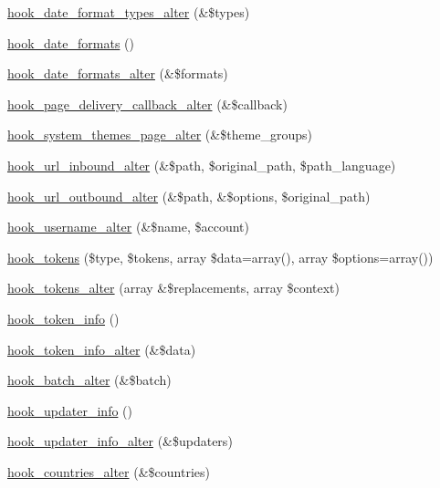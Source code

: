 \begin{DoxyCompactItemize}
\item 
\hyperlink{group__hooks_ga22573783fb241b759f4e3e2c211d13bf}{hook\_\-date\_\-format\_\-types\_\-alter} (\&\$types)
\item 
\hyperlink{group__hooks_ga2a190ba304193ab7752bfc489463a0d7}{hook\_\-date\_\-formats} ()
\item 
\hyperlink{group__hooks_ga0adddc1a49ca34ded3f081894de9d4f7}{hook\_\-date\_\-formats\_\-alter} (\&\$formats)
\item 
\hyperlink{group__hooks_gaee6a1d02d5046d47069a8e385385ef15}{hook\_\-page\_\-delivery\_\-callback\_\-alter} (\&\$callback)
\item 
\hyperlink{group__hooks_ga710e94821a231299d36b2405008121d9}{hook\_\-system\_\-themes\_\-page\_\-alter} (\&\$theme\_\-groups)
\item 
\hyperlink{group__hooks_ga32da9c3f1486c293818f30fa4037e33f}{hook\_\-url\_\-inbound\_\-alter} (\&\$path, \$original\_\-path, \$path\_\-language)
\item 
\hyperlink{group__hooks_gaae456dc4459a029bc099079814ded61f}{hook\_\-url\_\-outbound\_\-alter} (\&\$path, \&\$options, \$original\_\-path)
\item 
\hyperlink{group__hooks_ga877faf93c9acc42bb54cbd01cd8d9453}{hook\_\-username\_\-alter} (\&\$name, \$account)
\item 
\hyperlink{group__hooks_ga3bfd87d9a19b2397b0f970e1cff7ea4f}{hook\_\-tokens} (\$type, \$tokens, array \$data=array(), array \$options=array())
\item 
\hyperlink{group__hooks_gaeeea438e74b29e5603f0ed3f1967a257}{hook\_\-tokens\_\-alter} (array \&\$replacements, array \$context)
\item 
\hyperlink{group__hooks_gab868597197cf36911f95dcd29ae0b954}{hook\_\-token\_\-info} ()
\item 
\hyperlink{group__hooks_ga87392434688c9f52c4066de4ab9d73a8}{hook\_\-token\_\-info\_\-alter} (\&\$data)
\item 
\hyperlink{group__batch_ga135f2f5d27bc51f905cf9f36bde06a2e}{hook\_\-batch\_\-alter} (\&\$batch)
\item 
\hyperlink{group__hooks_gafb9b375716a0ad02d35250dc252b3c99}{hook\_\-updater\_\-info} ()
\item 
\hyperlink{group__hooks_gaf697fc432c34c994712849afa70c1b89}{hook\_\-updater\_\-info\_\-alter} (\&\$updaters)
\item 
\hyperlink{group__hooks_gaceba413e5b878b5f04668d1aa4fcb804}{hook\_\-countries\_\-alter} (\&\$countries)
\item 

\end{DoxyCompactItemize}
